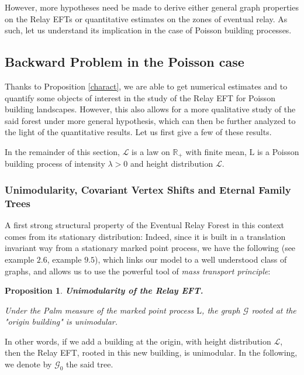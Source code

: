 \documentclass[10pt,english,a4paper]{smfart}
\newtheorem{proposition}{Proposition}[section]
\theoremstyle{definition}
\theoremstyle{remark}
\newcommand{\R}{\mathbb{R}}
\newcommand{\landsc}{\mathrm{L}}
\newcommand{\graph}{\mathcal{G}}
\begin{document}
However, more hypotheses need be made to derive either general graph properties on the Relay EFTs or quantitative estimates on the zones of eventual relay. As such, let us understand its implication in the case of Poisson building processes.

\subsection{Backward Problem in the Poisson case}

Thanks to Proposition \ref{charact}, we are able to get numerical estimates and to quantify some objects of interest in the study of the Relay EFT for Poisson building landscapes. However, this also allows for a more qualitative study of the said forest under more general hypothesis, which can then be further analyzed to the light of the quantitative results. Let us first give a few of these results.

In the remainder of this section, $\mathcal{L}$ is a law on $\R_+$ with finite mean, $\landsc$ is a Poisson building process of intensity $\lambda >0$ and height distribution $\mathcal{L}$.

\subsubsection*{Unimodularity, Covariant Vertex Shifts and Eternal Family Trees}

A first strong structural property of the Eventual Relay Forest in this context comes from its stationary distribution: Indeed, since it is built in a translation invariant way from a stationary marked point process, we have the following (see \cite{EFT} example $2.6$, \cite{Aldous} example $9.5$), which links our model to a well understood class of graphs, and allows us to use the powerful tool of \textit{mass transport principle}:

\begin{proposition}\label{unimodular}\textbf{Unimodularity of the Relay EFT.}

Under the Palm measure of the marked point process $\landsc$, the graph $\graph$ rooted at the "origin building" is unimodular.
\end{proposition}
In other words, if we add a building at the origin, with height distribution $\mathcal{L}$, then the Relay EFT, rooted in this new building, is unimodular. In the following, we denote by $\graph_0$ the said tree.
\end{document}
